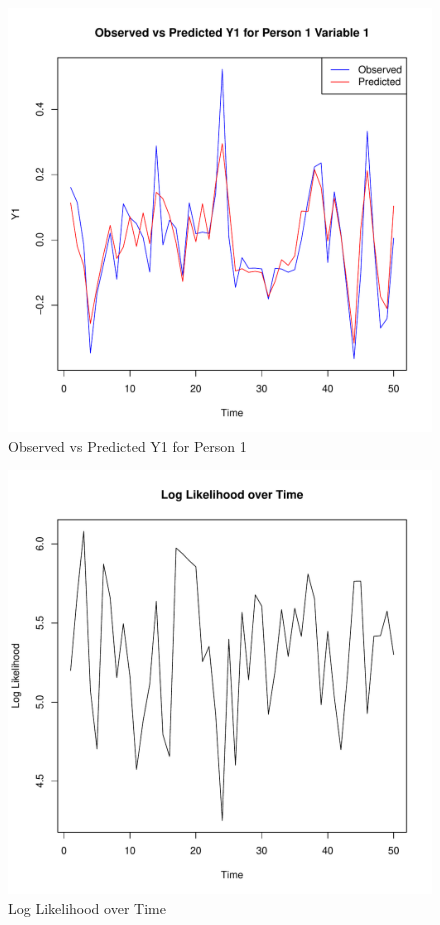 \documentclass{article}
\begin{document}
\begin{figure}[h]
  \centering
  \includegraphics[width=\textwidth]{predicted_vs_observed_y1.pdf}
  \caption{Observed vs Predicted Y1 for Person 1}
\end{figure}

\begin{figure}[h]
  \centering
  \includegraphics[width=\textwidth]{log_likelihood_over_time.pdf}
  \caption{Log Likelihood over Time}
\end{figure}
\end{document}
